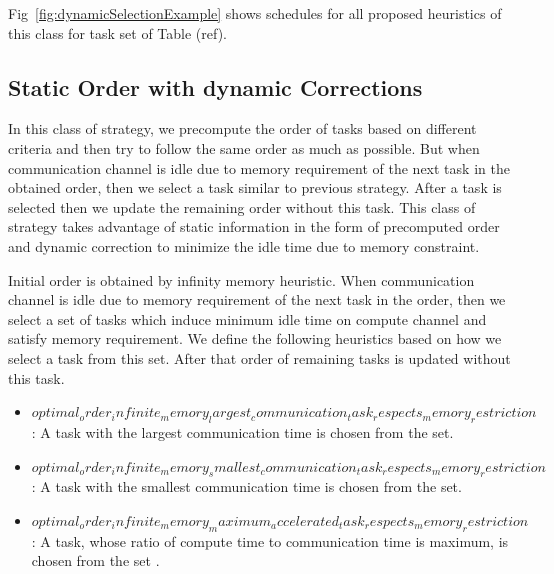\documentclass[runningheads]{llncs} %
\begin{document}
Fig~\ref{fig:dynamicSelectionExample} shows schedules for all proposed heuristics of this class for task set of Table (ref).

\subsection{Static Order with dynamic Corrections}

In this class of strategy, we precompute the order of tasks based on different criteria and then try to follow the same order as much as possible. But when communication channel is idle due to memory requirement of the next task in the obtained order, then we select a task similar to previous strategy. After a task is selected then we update the remaining order without this task. This class of strategy takes advantage of  static information in the form of precomputed order and dynamic correction to minimize the idle time due to memory constraint.

Initial order is obtained by infinity memory heuristic. When communication channel is idle due to memory requirement of the next task in the order, then we select a set of tasks which induce minimum idle time on compute channel and satisfy memory requirement. We define the following heuristics based on how we select a task from this set. After that order of remaining  tasks is updated without this task.

\begin{itemize}[a)]
	\item $optimal_order_infinite_memory_largest_communication_task_respects_memory_restriction$: A task with the largest communication time is chosen from the set.
	\item $optimal_order_infinite_memory_smallest_communication_task_respects_memory_restriction$:  A task with the smallest communication time is chosen from the set.
	\item $optimal_order_infinite_memory_maximum_accelerated_task_respects_memory_restriction$: A task,  whose ratio of compute time to communication time is maximum, is chosen from the set .
\end{itemize}
\end{document}
